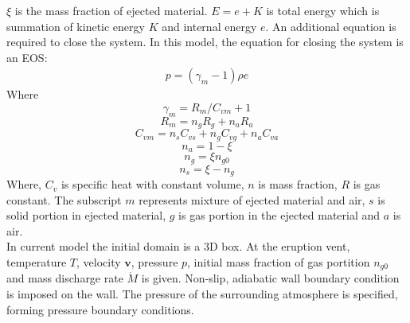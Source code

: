\documentclass[conference,compsoc]{IEEEtran}
\begin{document}
$\xi$ is the mass fraction of ejected material.
$E = e + K $ is total energy which is summation of kinetic energy $K$ and internal energy $e$.
An additional equation is required to close the system. In this model, the equation for closing the system is an EOS:
\begin{align}
p = (\gamma_m - 1)\rho e \label{eq:EOS}
\end{align}
Where 
\begin{equation}
\gamma_m = R_m/C_{vm} + 1 \label{eq:gov-gm}
\end{equation}
\begin{equation}
R_m = n_gR_g + n_aR_a  \label{eq:gov-Rm}
\end{equation}
\begin{equation}
C_{vm} = n_s C_{vs} + n_g C_{vg} + n_a C_{va} \label{eq:gov-Cvm}
\end{equation}
\begin{equation}
n_a = 1 - \xi \label{eq:gov-na}
\end{equation}
\begin{equation}
n_g = \xi n_{g0} \label{eq:gov-ng}
\end{equation}
\begin{equation}
n_s = \xi - n_g \label{eq:gov-ns}
\end{equation}
Where, $C_v$ is specific heat with constant volume, $n$ is mass fraction, $R$ is gas constant. The subscript 
$m$ represents mixture of ejected material and air, $s$ is solid portion in ejected material, $g$ is gas portion in the ejected material and $a$ is air.\\
In current model the initial domain is a 3D box. 
At the eruption vent, temperature $T$, velocity $\textbf{v}$, pressure $p$, initial mass fraction of gas portition $n_{g0}$ and mass discharge rate $\dot M$ is given. 
Non-slip, adiabatic wall boundary condition is imposed on the wall. The pressure of the surrounding atmosphere is specified, forming pressure boundary conditions. 
\end{document}
